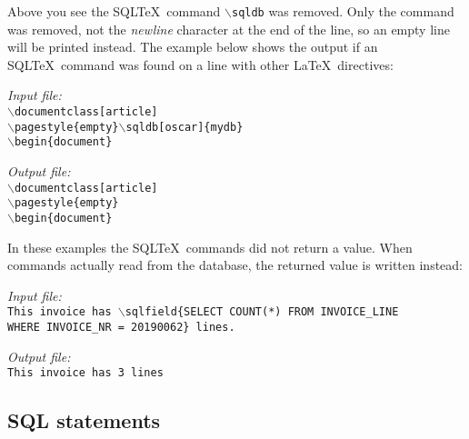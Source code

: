 \documentclass{article}
\newcommand{\bs}{\ensuremath{\backslash}}
\newcommand{\vs}{\vspace{3mm}}
\begin{document}
\vs

Above you see the SQL\TeX\ command \texttt{\bs sqldb} was removed. Only the command was removed, not
the \textsl{newline} character at the end of the line, so an empty line will be printed instead.
The example below shows the output if an SQL\TeX\ command was found on a line with other \LaTeX\
directives:

\vs

\begin{minipage}[t]{0.5\textwidth}\textsl{Input file:}\\\texttt{\footnotesize{\bs documentclass[article] \\
\bs pagestyle\{empty\}\bs sqldb[oscar]\{mydb\} \\
\bs begin\{document\} \\
\hrulefill}}\end{minipage}\hfill\begin{minipage}[t]{0.5\textwidth}\textsl{Output file:}\\\texttt{\footnotesize{\bs documentclass[article] \\
\bs pagestyle\{empty\} \\
\bs begin\{document\} \\
}}\end{minipage}

\vs

In these examples the SQL\TeX\ commands did not return a value. When commands actually read from
the database, the returned value is written instead:

\vs

\begin{minipage}[t]{0.5\textwidth}\textsl{Input file:}\\\texttt{\footnotesize{This invoice has \bs sqlfield\{SELECT COUNT(*) FROM INVOICE\_LINE \\
WHERE INVOICE\_NR = 20190062\} lines.\\
\hrulefill}}\end{minipage}\hfill\begin{minipage}[t]{0.5\textwidth}\textsl{Output file:}\\\texttt{\footnotesize{This invoice has 3 lines \\
}}\end{minipage}

\subsection{SQL statements}\label{sqlstatements}
\end{document}
